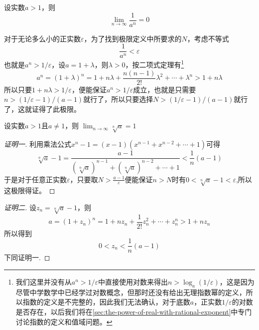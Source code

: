 \begin{example}
  设实数$a>1$，则
  \[ \lim_{n \to \infty} \frac{1}{a^n} = 0 \]

  对于无论多么小的正实数$\varepsilon$，为了找到极限定义中所要求的$N$，考虑不等式
  \[ \frac{1}{a^n} < \varepsilon \]
  也就是$a^n>1/\varepsilon$，设$a=1+\lambda$，则$\lambda>0$，按二项式定理有\footnote{我们这里并没有从$a^n>1/\varepsilon$中直接使用对数来得出$n>\log_a{(1/\varepsilon)}$，这是因为尽管中学数学中已经学过对数概念，但那时还没有给出无理指数幂的定义，所以指数的定义是不完整的，因此我们无法确认，对于底数$a$，正实数$1/\varepsilon$的对数是否存在，以后我们将在\autoref{sec:the-power-of-real-with-rational-exponent}中专门讨论指数的定义和值域问题。}
  \[ a^n = (1+\lambda)^n = 1 + n\lambda + \frac{n(n-1)}{2!}\lambda^2+\cdots+\lambda^n > 1+n \lambda \]
  所以只要$1+n\lambda>1/\varepsilon$，便能保证$a^n>1/\varepsilon$成立，也就是只需要$n > (1/\varepsilon-1) / (a-1)$就行了，所以只要选择$N>(1/\varepsilon-1)/(a-1)$就行了，这就证得了此极限。
\end{example}

\begin{example}
  \label{example:limit-of-n-sqrt-a-when-a-greater-than-1}
  设实数$a>1$且$a \neq 1$，则 $\lim_{n \to \infty} \sqrt[n]{a} = 1$

  \begin{proof}[证明一]
    利用乘法公式$x^n-1=(x-1)(x^{n-1}+x^{n-2}+\cdots+1)$可得
    \[ \sqrt[n]{a}-1 = \frac{a-1}{(\sqrt[n]{a})^{n-1}+(\sqrt[n]{a})^{n-2}+\cdots+1} < \frac{1}{n}(a-1) \]
   于是对于任意正实数$\varepsilon$，只要取$N>\frac{a-1}{\varepsilon}$便能保证$n>N$时有$0<\sqrt[n]{a}-1<\varepsilon$,所以这极限得证。
  \end{proof}

  \begin{proof}[证明二]
    设$z_n=\sqrt[n]{a}-1$，则
    \[ a = (1+z_n)^n = 1+ nz_n+\frac{1}{2!}z_n^2+\cdots+z_n^n > 1+ n z_n \]
    所以得到
    \[ 0<z_n<\frac{1}{n}(a-1) \]
    下同证明一.
  \end{proof}
\end{example}


